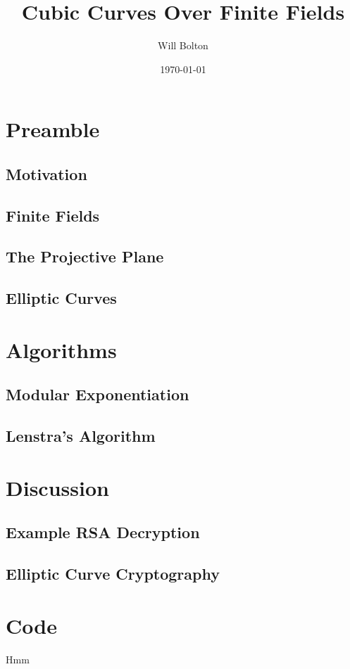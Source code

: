 \documentclass{article}
\title{Cubic Curves Over Finite Fields}
\author{Will Bolton}
\date{\today}
\begin{document}
\maketitle
\tableofcontents

\section{Preamble}
\subsection{Motivation}

\subsection{Finite Fields}

\subsection{The Projective Plane}

\subsection{Elliptic Curves}




\section{Algorithms}
\subsection{Modular Exponentiation}

\subsection{Lenstra's Algorithm}


\section{Discussion}
\subsection{Example RSA Decryption}

\subsection{Elliptic Curve Cryptography}


\appendix
\section{Code}
Hmm
\cite{silverman-rational}
\cite{silverman-arithmetic}
\cite{fraleigh2013}
\cite{goodman1998}
%


\end{document}
